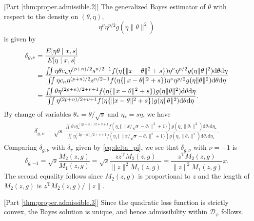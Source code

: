 \documentclass[preprint,11pt]{imsart}
\numberwithin{equation}{section}
\theoremstyle{plain}
\theoremstyle{definition}
\theoremstyle{remark}
\def\T{{ \mathrm{\scriptscriptstyle T} }}
\newcommand{\rd}{\mathrm{d}}
\begin{document}
[Part \ref{thm:proper.admissible.2}]\mbox{}
The generalized Bayes estimator of $\theta$ with respect to the density on $(\theta,\eta)$,
\begin{equation*}
 \eta^\nu\eta^{p/2}g(\eta\|\theta\|^2)
\end{equation*}
is given by
\begin{align}
 \delta_{g,\nu}&
=\frac{E[\eta\theta\mid x,s]}{E[\eta\mid x,s]} \notag\\
& =\frac{\iint \eta\theta c_n\eta^{(p+n)/2}s^{n/2-1}f(\eta\{\|x-\theta\|^2+s\})\eta^\nu\eta^{p/2}g(\eta\|\theta\|^2) \rd \theta  \rd \eta}
 {\iint \eta c_n\eta^{(p+n)/2}s^{n/2-1}f(\eta\{\|x-\theta\|^2+s\})\eta^\nu\eta^{p/2}g(\eta\|\theta\|^2) \rd \theta  \rd \eta} \notag \\
 &=\frac{\iint \theta \eta^{(2p+n)/2+\nu+1}f(\eta\{\|x-\theta\|^2+s\})g(\eta\|\theta\|^2) \rd \theta  \rd \eta}
 {\iint  \eta^{(2p+n)/2+\nu+1}f(\eta\{\|x-\theta\|^2+s\})g(\eta\|\theta\|^2) \rd \theta  \rd \eta}.
 \label{eq:ap.gbgnu}
\end{align}
By change of variables $\theta_*=\theta/\sqrt{s}$ and $\eta_*=s\eta$, we have
 \begin{align*}
  \delta_{g,\nu} =\sqrt{s}\frac{\iint \theta_* \eta_*^{(2p+n)/2+\nu+1}f(\eta_*\{\|x/\sqrt{s}-\theta_*\|^2+1\})
  g(\eta_*\|\theta_*\|^2) \rd \theta_*  \rd \eta_*}
 {\iint \eta_*^{(2p+n)/2+\nu+1}f(\eta_*\{\|x/\sqrt{s}-\theta_*\|^2+1\})g(\eta_*\|\theta_*\|^2) \rd \theta_*  \rd \eta_*}. 
\end{align*}
Comparing $\delta_{g,\nu}$ with $\delta_\pi$ given by \eqref{eq:delta_pi},
we see that $\delta_{g,\nu}$ with $\nu=-1$ is 
\begin{equation*}
\delta_{g,-1}  =\sqrt{s}\frac{M_2(z,g)}{M_1(z,g)} 
=\sqrt{s}\frac{z z^\T M_2(z,g)}{\|z\|^2 M_1(z,g)} 
 =\frac{z^\T M_2(z,g)}{\|z\|^2 M_1(z,g)}x.
\end{equation*}
The second equality follows since $M_2(z,g)$ is proportional to $z$ and
the length of $ M_2(z,g)$ is $z^\T M_2(z,g)/\|z\|$.

[Part \ref{thm:proper.admissible.3}]\mbox{}
Since the  quadratic loss function is strictly convex, the Bayes solution is unique,
and hence admissibility within $\mathcal{D}_\psi$ follows.
\end{document}
